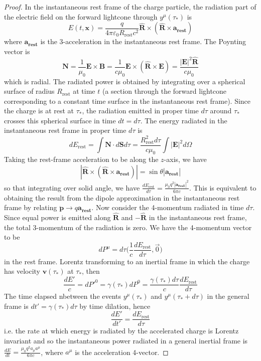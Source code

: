 \documentclass[a4paper]{article}
\theoremstyle{new}
\begin{document}
\begin{proof}
In the instantaneous rest frame of the charge particle, the radiation part of the electric field on the forward lightcone through $y^\mu(\tau_*)$ is
$$E(t,\mathbf{x})=\frac{q}{4\pi\varepsilon_0R_{\text{rest}}c^2}\mathbf{\hat{R}}\times(\mathbf{\hat{R}}\times\mathbf{a_{\text{rest}}})$$
where $\mathbf{a_{\text{rest}}}$ is the 3-acceleration in the instantaneous rest frame. The Poynting vector is
$$\mathbf{N}=\frac{1}{\mu_0}\mathbf{E}\times\mathbf{B}=\frac{1}{c\mu_0}\mathbf{E}\times(\mathbf{\hat{R}}\times\mathbf{E})=\frac{|\mathbf{E}|^2\mathbf{\hat{R}}}{c\mu_0}$$
which is radial. The radiated power is obtained by integrating over a spherical surface of radius $R_{\text{rest}}$ at time $t$ (a section through the forward lightcone corresponding to a constant time surface in the instantaneous rest frame). Since the charge is at rest at $\tau_*$, the radiation emitted in proper time $d\tau$ around $\tau_*$ crosses this spherical surface in time $dt=d\tau$. The energy radiated in the instantaneous rest frame in proper time $d\tau$ is
$$dE_{\text{rest}}=\int\mathbf{N}\cdot d\mathbf{S}d\tau=\frac{R_{\text{rest}}^2d\tau}{c\mu_0}\int|\mathbf{E}|^2d\Omega$$
Taking the rest-frame acceleration to be along the $z$-axis, we have
$$|\mathbf{\hat{R}}\times(\mathbf{\hat{R}}\times\mathbf{a_{\text{rest}}})|=\sin\theta|\mathbf{a_{\text{rest}}}|$$
so that integrating over solid angle, we have $\frac{dE_{\text{rest}}}{d\tau}=\frac{\mu_0q^2|\mathbf{a_{\text{rest}}}|^2}{6\pi c}$. This is equivalent to obtaining the result from the dipole approximation in the instantaneous rest frame by relating $\mathbf{\ddot{p}}\rightarrow q\mathbf{a_{\text{rest}}}$. Now consider the 4-momentum radiated in time $d\tau$. Since equal power is emitted along $\mathbf{\hat{R}}$ and $-\mathbf{\hat{R}}$ in the instantaneous rest frame, the total 3-momentum of the radiation is zero. We have the 4-momentum vector to be
$$dP^\mu=d\tau\bigg(\frac{1}{c}\frac{dE_{\text{rest}}}{d\tau},\vec{0}\bigg)$$
in the rest frame. Lorentz transforming to an inertial frame in which the charge has velocity $\mathbf{v}(\tau_*)$ at $\tau_*$, then
$$\frac{dE'}{c}=dP'^0=\gamma(\tau_*)dP^0=\frac{\gamma(\tau_*)d\tau}{c}\frac{dE_{\text{rest}}}{d\tau}$$
The time elapsed nbetween the events $y^\mu(\tau_*)$ and $y^\mu(\tau_*+d\tau)$ in the general frame is $dt'=\gamma(\tau_*)d\tau$ by time dilation, hence
$$\frac{dE'}{dt'}=\frac{dE_{\text{rest}}}{d\tau}$$
i.e. the rate at which energy is radiated by the accelerated charge is Lorentz invariant and so the instantaneous power radiated in a general inertial frame is $\frac{dE}{dt}=\frac{\mu_0q^2a_\mu a^\mu}{6\pi c}$, where $a^\mu$ is the acceleration 4-vector.
\end{proof}
\end{document}
